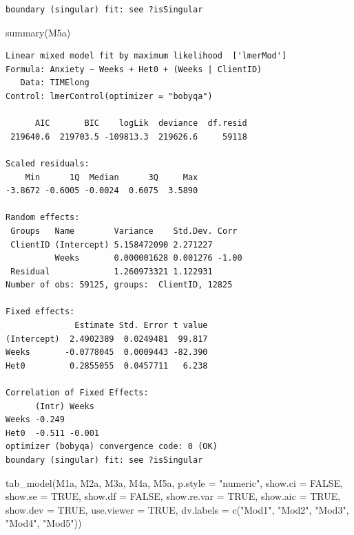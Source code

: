 \documentclass[
  11pt,
]{book}
\newenvironment{Shaded}{\begin{snugshade}}{\end{snugshade}}
\newcommand{\AttributeTok}[1]{\textcolor[rgb]{0.77,0.63,0.00}{#1}}
\newcommand{\ConstantTok}[1]{\textcolor[rgb]{0.00,0.00,0.00}{#1}}
\newcommand{\FunctionTok}[1]{\textcolor[rgb]{0.00,0.00,0.00}{#1}}
\newcommand{\NormalTok}[1]{#1}
\newcommand{\StringTok}[1]{\textcolor[rgb]{0.31,0.60,0.02}{#1}}
\begin{document}
\begin{verbatim}
boundary (singular) fit: see ?isSingular
\end{verbatim}

\begin{Shaded}
\begin{Highlighting}[]
\FunctionTok{summary}\NormalTok{(M5a)}
\end{Highlighting}
\end{Shaded}

\begin{verbatim}
Linear mixed model fit by maximum likelihood  ['lmerMod']
Formula: Anxiety ~ Weeks + Het0 + (Weeks | ClientID)
   Data: TIMElong
Control: lmerControl(optimizer = "bobyqa")

      AIC       BIC    logLik  deviance  df.resid 
 219640.6  219703.5 -109813.3  219626.6     59118 

Scaled residuals: 
    Min      1Q  Median      3Q     Max 
-3.8672 -0.6005 -0.0024  0.6075  3.5890 

Random effects:
 Groups   Name        Variance    Std.Dev. Corr 
 ClientID (Intercept) 5.158472090 2.271227      
          Weeks       0.000001628 0.001276 -1.00
 Residual             1.260973321 1.122931      
Number of obs: 59125, groups:  ClientID, 12825

Fixed effects:
              Estimate Std. Error t value
(Intercept)  2.4902389  0.0249481  99.817
Weeks       -0.0778045  0.0009443 -82.390
Het0         0.2855055  0.0457711   6.238

Correlation of Fixed Effects:
      (Intr) Weeks 
Weeks -0.249       
Het0  -0.511 -0.001
optimizer (bobyqa) convergence code: 0 (OK)
boundary (singular) fit: see ?isSingular
\end{verbatim}

\begin{Shaded}
\begin{Highlighting}[]
\FunctionTok{tab\_model}\NormalTok{(M1a, M2a, M3a, M4a, M5a, }\AttributeTok{p.style =} \StringTok{"numeric"}\NormalTok{, }\AttributeTok{show.ci =} \ConstantTok{FALSE}\NormalTok{, }\AttributeTok{show.se =} \ConstantTok{TRUE}\NormalTok{, }\AttributeTok{show.df =} \ConstantTok{FALSE}\NormalTok{, }\AttributeTok{show.re.var =} \ConstantTok{TRUE}\NormalTok{, }\AttributeTok{show.aic =} \ConstantTok{TRUE}\NormalTok{, }\AttributeTok{show.dev =} \ConstantTok{TRUE}\NormalTok{, }\AttributeTok{use.viewer =} \ConstantTok{TRUE}\NormalTok{, }\AttributeTok{dv.labels =} \FunctionTok{c}\NormalTok{(}\StringTok{"Mod1"}\NormalTok{, }\StringTok{"Mod2"}\NormalTok{, }\StringTok{"Mod3"}\NormalTok{, }\StringTok{"Mod4"}\NormalTok{, }\StringTok{"Mod5"}\NormalTok{))}
\end{Highlighting}
\end{Shaded}
\end{document}
